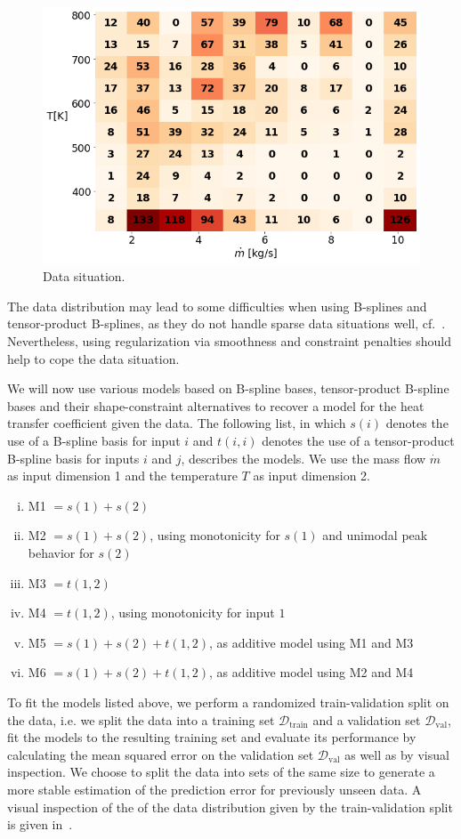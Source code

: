 \begin{figure}[H]
	\centering
	\includegraphics[width=0.8\columnwidth]{graphics/pgfplots/cha5/Ebner/data_distribution.png}
	\caption{Data situation.}
	\label{fig:ebner_data_situation}
\end{figure}

The data distribution may lead to some difficulties when using B-splines and tensor-product B-splines, as they do not handle sparse data situations well, cf.~. Nevertheless, using regularization via smoothness and constraint penalties should help to cope the data situation. 

We will now use various models based on B-spline bases, tensor-product B-spline bases and their shape-constraint alternatives to recover a model for the heat transfer coefficient given the data. The following list, in which $s(i)$ denotes the use of a B-spline basis for input $i$ and $t(i,i)$ denotes the use of a tensor-product B-spline basis for inputs $i$ and $j$, describes the models. We use the mass flow $\dot{m}$ as input dimension 1 and the temperature $T$ as input dimension 2. 

\begin{enumerate}[(i)]
	\item M1 $= s(1) + s(2)$
	\item M2 $= s(1) + s(2)$, using monotonicity for $s(1)$ and unimodal peak behavior for $s(2)$
	\item M3 $= t(1,2)$
	\item M4 $= t(1,2)$, using monotonicity for input $1$
	\item M5 $= s(1) + s(2) + t(1,2)$, as additive model using M1 and M3
	\item M6 $= s(1) +s(2) + t(1,2)$, as additive model using M2 and M4
\end{enumerate}
%
To fit the models listed above, we perform a randomized train-validation split on the data, i.e. we split the data into a training set $\mathcal{D}_{\text{train}}$ and a validation set $\mathcal{D}_{\text{val}}$, fit the models to the resulting training set and evaluate its performance by calculating the mean squared error on the validation set $\mathcal{D}_{\text{val}}$ as well as by visual inspection. We choose to split the data into sets of the same size to generate a more stable estimation of the prediction error for previously unseen data. A visual inspection of the of the data distribution given by the train-validation split is given in~.

